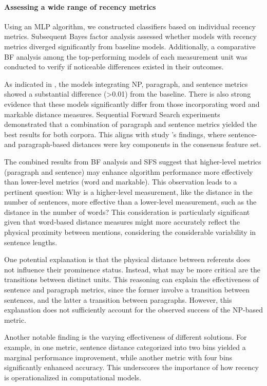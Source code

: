 \paragraph*{Assessing a wide range of recency metrics} 

Using an MLP algorithm, we constructed classifiers based on individual recency metrics. Subsequent Bayes factor analysis assessed whether models with recency metrics diverged significantly from baseline models. Additionally, a comparative BF analysis among the top-performing models of each measurement unit was conducted to verify if noticeable differences existed in their outcomes.

As indicated in , the \wsj models integrating NP, paragraph, and sentence metrics showed a substantial difference (>0.01) from the baseline. There is also strong evidence that these models significantly differ from those incorporating word and markable distance measures. Sequential Forward Search experiments demonstrated that a combination of paragraph and sentence metrics yielded the best results for both corpora. This aligns with study \studB's findings, where sentence- and paragraph-based distances were key components in the consensus feature set.

The combined results from BF analysis and SFS suggest that higher-level metrics (paragraph and sentence) may enhance algorithm performance more effectively than lower-level metrics (word and markable). This observation leads to a pertinent question: Why is a higher-level measurement, like the distance in the number of sentences, more effective than a lower-level measurement, such as the distance in the number of words? This consideration is particularly significant given that word-based distance measures might more accurately reflect the physical proximity between mentions, considering the considerable variability in sentence lengths. 

One potential explanation is that the physical distance between referents does not influence their prominence status. Instead, what may be more critical are the transitions between distinct units. This reasoning can explain the effectiveness of sentence and paragraph metrics, since the former involve a transition between sentences, and the latter a transition between paragraphs. However, this explanation does not sufficiently account for the observed success of the NP-based metric.

Another notable finding is the varying effectiveness of different solutions. For example, in one metric, sentence distance categorized into two bins yielded a marginal performance improvement, while another metric with four bins significantly enhanced accuracy. This underscores the importance of how recency is operationalized in computational models.

